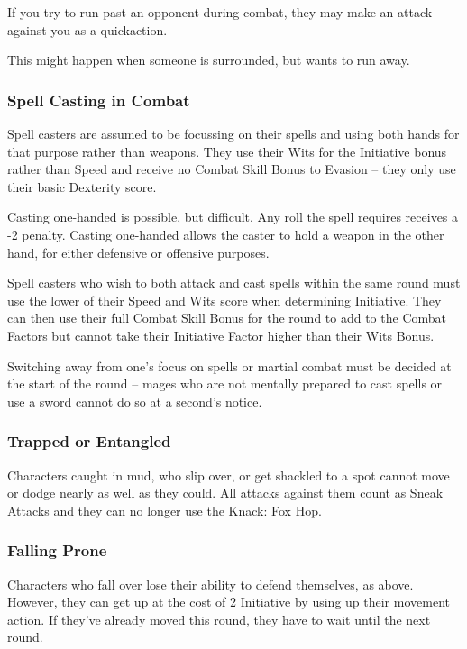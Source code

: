 \begin{multicols}{2}
If you try to run past an opponent during combat, they may make an attack against you as a \gls{quickaction}.

This might happen when someone is surrounded, but wants to run away.

\subsubsection{Spell Casting in Combat}
\label{combatcasting}

Spell casters are assumed to be focussing on their spells and using both hands for that purpose rather than weapons. They use their Wits for the Initiative bonus rather than Speed and receive no Combat Skill Bonus to Evasion -- they only use their basic Dexterity score.

Casting one-handed is possible, but difficult.
Any roll the spell requires receives a -2 penalty.
Casting one-handed allows the caster to hold a weapon in the other hand, for either defensive or offensive purposes.

Spell casters who wish to both attack and cast spells within the same \gls{round} must use the lower of their Speed and Wits score when determining Initiative. They can then use their full Combat Skill Bonus for the \gls{round} to add to the Combat Factors but cannot take their Initiative Factor higher than their Wits Bonus.

Switching away from one's focus on spells or martial combat must be decided at the start of the \gls{round} -- mages who are not mentally prepared to cast spells or use a sword cannot do so at a second's notice.

\subsubsection{Trapped or Entangled}

Characters caught in mud, who slip over, or get shackled to a spot cannot move or dodge nearly as well as they could.
All attacks against them count as Sneak Attacks and they can no longer use the Knack: Fox Hop.

\subsubsection{Falling Prone}
\label{prone}

Characters who fall over lose their ability to defend themselves, as above.
However, they can get up at the cost of 2 Initiative by using up their movement action.
If they've already moved this \gls{round}, they have to wait until the next \gls{round}.


\end{multicols}

